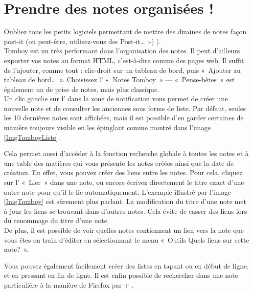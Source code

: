 \section{Prendre des notes organisées !}
\label{RefTomboy}
Oubliez tous les petits logiciels permettant de mettre des dizaines de notes façon post-it (ou peut-être, utilisez-vous des Post-it\ldots{} :-) ).\\
Tomboy est un  très performant dans l'organisation des notes. Il peut d'ailleurs exporter vos notes au format HTML, c'est-à-dire comme des pages web. Il suffit de l'ajouter, comme tout  : clic-droit sur un tableau de bord, puis «~Ajouter au tableau de bord\ldots{}~». Choisissez l' «~Notes Tomboy~» --- «~Pense-bêtes~» est également un  de prise de notes, mais plus classique.\\
Un clic gauche sur l' dans la zone de notification vous permet de créer une nouvelle note et de consulter les anciennes sous forme de liste. Par défaut, seules les 10 dernières notes sont affichées, mais il est possible d'en garder certaines de manière toujours visible en les épinglant comme montré dans l'image \ref{ImgTomboyListe}.\par
{}
Cela permet aussi d'accéder à la fonction recherche globale à toutes les notes et à une table des matières qui vous présente les notes créées ainsi que la date de création. En effet, vous pouvez créer des liens entre les notes. Pour cela, cliquez sur l' «~Lier~» dans une note, ou encore écrivez directement le titre exact d'une autre note pour qu'il le lie automatiquement. L'exemple illustré par l'image \ref{ImgTomboy} est sûrement plus parlant. La modification du titre d'une note met à jour les liens se trouvant dans d'autres notes. Cela évite de casser des liens lors du renommage du titre d'une note.\\
De plus, il est possible de voir quelles notes contiennent un lien vers la note que vous êtes en train d'éditer en sélectionnant le menu «~Outils \FlecheDroite Quels liens sur cette note?~».\par
Vous pouvez également facilement créer des listes en tapant \Touche{*} ou \Touche{-} en début de ligne, et en pressant  en fin de ligne. Il est enfin possible de rechercher dans une note particulière à la manière de Firefox par  + .\par
